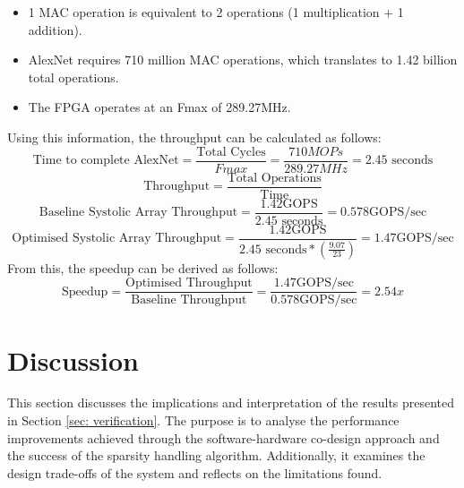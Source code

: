 \documentclass[12pt, a4paper, ukenglish]{article}
\begin{document}
    \begin{itemize}
        \item 1 MAC operation is equivalent to 2 operations (1 multiplication + 1 addition).
        \item AlexNet requires 710 million MAC operations, which translates to 1.42 billion total operations.
        \item The FPGA operates at an Fmax of 289.27MHz.
    \end{itemize}
    Using this information, the throughput can be calculated as follows:
    \begin{equation}
        \text{Time to complete AlexNet} = \frac{\text{Total Cycles}}{Fmax} = \frac{710M OPs}{289.27MHz} = 2.45 \text{ seconds}
    \end{equation}
    \begin{equation}
        \text{Throughput} = \frac{\text{Total Operations}}{\text{Time}}
    \end{equation}
    \begin{equation}
        \text{Baseline Systolic Array Throughput} =  \frac{1.42 \text{GOPS}}{2.45 \text{ seconds}} = 0.578 \text{GOPS/sec}
    \end{equation}
    \begin{equation}
        \text{Optimised Systolic Array Throughput} = \frac{1.42 \text{GOPS}}{2.45 \text{ seconds} * \left(\frac{9.07}{23}\right)} = 1.47 \text{GOPS/sec}
    \end{equation}
    \newline
    From this, the speedup can be derived as follows:
    \begin{equation}
        \text{Speedup} = \frac{\text{Optimised Throughput}}{\text{Baseline Throughput}} = \frac{1.47 \text{GOPS/sec}}{0.578 \text{GOPS/sec}} = 2.54x
    \end{equation}

    
    
    

\section{Discussion} \label{sec: discussion}
This section discusses the implications and interpretation of the results presented in Section \ref{sec: verification}. The purpose is to analyse the performance improvements achieved through the software-hardware co-design approach and the success of the sparsity handling algorithm. Additionally, it examines the design trade-offs of the system and reflects on the limitations found. 
\end{document}
